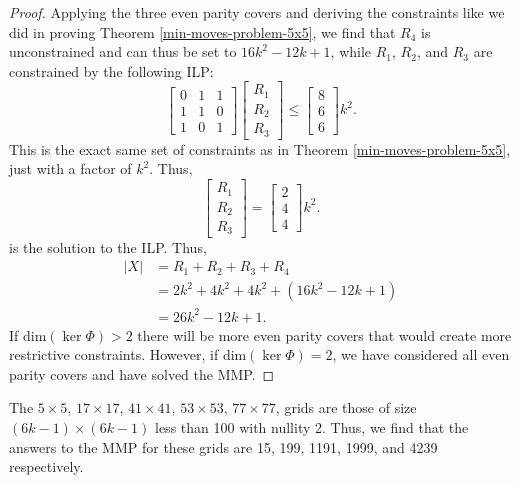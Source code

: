 \documentclass[a4paper]{article}
\newcommand{\abs}[1]{\left| #1 \right|}
\renewcommand{\dim}[1]{\text{dim}\left( #1 \right)}
\begin{document}
\begin{proof}
		Applying the three even parity covers and deriving the constraints like we did in proving Theorem \ref{min-moves-problem-5x5}, we find that $R_4$ is unconstrained and can thus be set to $16k^2 - 12k + 1$, while $R_1$, $R_2$, and $R_3$ are constrained by the following ILP:
		\begin{equation}
			\begin{bmatrix}
				0 & 1 & 1 \\
				1 & 1 & 0 \\
				1 & 0 & 1 
			\end{bmatrix}
			\begin{bmatrix}
				R_1 \\
				R_2 \\
				R_3
			\end{bmatrix}
			\leq
			\begin{bmatrix}
				8 \\
				6 \\
				6
			\end{bmatrix}k^2.
		\end{equation}
		This is the exact same set of constraints as in Theorem \ref{min-moves-problem-5x5}, just with a factor of $k^2$.
		Thus,
		\begin{equation*}
			\begin{bmatrix}
				R_1 \\
				R_2 \\
				R_3
			\end{bmatrix}
			=
			\begin{bmatrix}
				2 \\
				4 \\
				4
			\end{bmatrix}k^2.
		\end{equation*}
		is the solution to the ILP.
		Thus,
		\begin{align*}
			\abs{X} &=  R_1 + R_2 + R_3 + R_4 \\
				&= 2k^2 + 4k^2 +  4k^2 + (16k^2 - 12k + 1) \\
				&= 26k^2 - 12k + 1.
		\end{align*}
		If $\dim{\ker{\Phi}} > 2$ there will be more even parity covers that would create more restrictive constraints.
		However, if $\dim{\ker{\Phi}} = 2$, we have considered all even parity covers and have solved the MMP.
	\end{proof}

	The $5 \times 5$, $17 \times 17$, $41 \times 41$, $53 \times 53$, $77 \times 77$, grids are those of size $(6k-1) \times (6k-1)$ less than 100 with nullity 2.
	Thus, we find that the answers to the MMP for these grids are 15, 199, 1191, 1999, and 4239 respectively.
	
\end{document}

